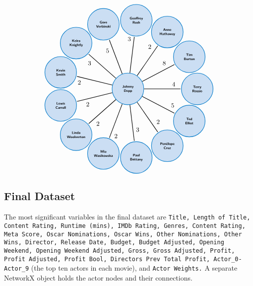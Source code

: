 \documentclass[11pt]{article}
\begin{document}
\[
\begin{tikzpicture}[shorten >=1pt,thick]

\foreach [count=\i] \a/\t/\d in {2/Anne\\Hathaway/3.5, 3/Geoffrey\\Rush/3.5, 4/Gore\\Verbinski/3.5, 5/Keira\\Knightly/3.5, 6/Kevin\\Smith/3.5, 7/Lewis\\Carroll/3.5, 8/Linda\\Woolverton/3.5, 9/Mia\\Wasikowska/3.5, 10/Paul\\Bettany/3.5, 11/Penélope\\Cruz/3.5, 12/Ted\\Elliot/3.5, 13/Terry\\Rossio/3.5, 1/Tim\\Burton/3.5, 0/Johnny\\Depp/0}
\draw (\a*360/13: \d cm) node[circle,draw=blue,fill=blue!20!,font=\sffamily\tiny\bfseries,align=center,minimum size=1.6cm] (v\i)  {\t};

\foreach \i/\j/\w in {14/1/2,14/2/3,14/3/5,14/4/3,14/5/2,14/6/2,14/7/2,14/8/2,14/9/3,14/10/2,14/11/5,14/12/4,14/13/8}
\draw [black,thick]  (v\i) edge node [font=\small,pos=.8,auto] {\w} (v\j);


\end{tikzpicture}
\]

\hypertarget{final-dataset}{%
	\subsection{Final Dataset}\label{final-dataset}}
The most significant variables in the final dataset are \texttt{Title, Length of Title,
Content Rating, Runtime (mins), IMDb Rating, Genres, Content Rating, Meta
Score, Oscar Nominations, Oscar Wins, Other Nominations, Other
Wins, Director, Release Date, Budget, Budget Adjusted, Opening Weekend, Opening Weekend Adjusted, Gross, Gross Adjusted, Profit, Profit Adjusted, Profit Bool, Directors Prev Total Profit, Actor\_0-Actor\_9} (the top ten actors in each movie), and \texttt{Actor Weights.} A separate
NetworkX object holds the actor nodes and their connections. 




\end{document}
